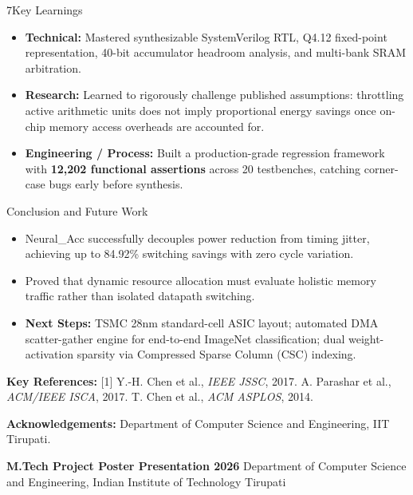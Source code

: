 \documentclass{article}
\newcommand{\affilsize}{\fontsize{21}{28}\selectfont}
\newcommand{\smallsize}{\fontsize{16}{21}\selectfont}
\newcommand{\subhead}[1]{{\color{iitmaroon}\bfseries #1}}
\begin{document}
\begin{minipage}[t]{0.488\textwidth}\vspace{0pt}
\begin{posterblock}[equal height group=rowC]{7}{Key Learnings}
\begin{itemize}
  \item \textbf{Technical:} Mastered synthesizable SystemVerilog RTL, Q4.12 fixed-point representation, 40-bit accumulator headroom analysis, and multi-bank SRAM arbitration.
  \item \textbf{Research:} Learned to rigorously challenge published assumptions: throttling active arithmetic units does not imply proportional energy savings once on-chip memory access overheads are accounted for.
  \item \textbf{Engineering / Process:} Built a production-grade regression framework with \textbf{12,202 functional assertions} across 20 testbenches, catching corner-case bugs early before synthesis.
\end{itemize}
\end{posterblock}
\end{minipage}%
\hfill
\begin{minipage}[t]{0.488\textwidth}\vspace{0pt}
\begin{posterblock}[equal height group=rowC]{}{Conclusion and Future Work}
\begin{itemize}
  \item Neural\_Acc successfully decouples power reduction from timing jitter, achieving up to 84.92\% switching savings with zero cycle variation.
  \item Proved that dynamic resource allocation must evaluate holistic memory traffic rather than isolated datapath switching.
  \item \textbf{Next Steps:} TSMC 28nm standard-cell ASIC layout; automated DMA scatter-gather engine for end-to-end ImageNet classification; dual weight-activation sparsity via Compressed Sparse Column (CSC) indexing.
\end{itemize}
{\smallsize
\subhead{Key References:}
[1] Y.-H. Chen et al., \emph{IEEE JSSC}, 2017. \quad
[2] A. Parashar et al., \emph{ACM/IEEE ISCA}, 2017. \quad
[3] T. Chen et al., \emph{ACM ASPLOS}, 2014.\par
\subhead{Acknowledgements:} Department of Computer Science and Engineering, IIT Tirupati.\par}
\end{posterblock}
\end{minipage}

\vfill
\begin{tcolorbox}[enhanced, colback=iitmaroon, colframe=iitmaroon, arc=0pt,
  boxrule=0pt, left=16pt, right=16pt, top=7pt, bottom=7pt,
  fontupper=\affilsize\color{white}]
\textbf{M.Tech Project Poster Presentation 2026} \hfill
Department of Computer Science and Engineering, Indian Institute of Technology Tirupati
\end{tcolorbox}
\end{document}
